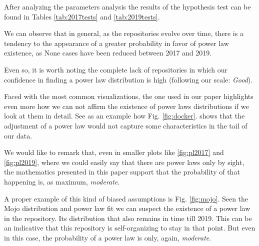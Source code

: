 \documentclass[conference]{IEEEtran}
\begin{document}
After analyzing the parameters analysis the results of the hypothesis test can be found in Tables \ref{tab:2017tests} and \ref{tab:2019tests}. 

We can observe that in general, as the repositories evolve over time, there is a tendency to the appearance of a greater probability in favor of power law existence, as None cases have been reduced between 2017 and 2019.

Even so, it is worth noting the complete lack of repositories in which our confidence in finding a power law distribution is high (following our scale: \textit{Good}).

Faced with the most common visualizations, the one used in our paper highlights even more how we can not affirm the existence of power laws distributions if we look at them in detail. See as an example how Fig. \ref{fig:docker}. shows that the adjustment of a power law would not capture some characteristics in the tail of our data. 

We would like to remark that, even in smaller plots like \ref{fig:pl2017} and \ref{fig:pl2019}, where we could easily say that there are power laws only by sight, the mathematics presented in this paper support that the probability of that happening is, as maximum, \textit{ moderate}.

A proper example of this kind of biased assumptions is Fig. \ref{fig:mojo}. Seen the Mojo distribution and power law fit we can suspect the existence of a power law in the repository. Its distribution that also remains in time till 2019. This can be an indicative that this repository is self-organizing to stay in that point. But even in this case, the probability of a power law is only, again, \textit{moderate}.
\end{document}
